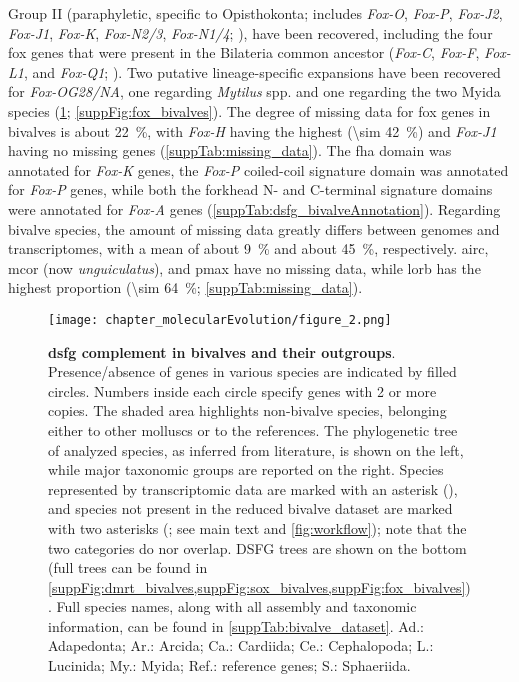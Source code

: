 Group II (paraphyletic, specific to Opisthokonta; includes \textit{Fox-O}, \textit{Fox-P}, \textit{Fox-J2}, \textit{Fox-J1}, \textit{Fox-K}, \textit{Fox-N2/3}, \textit{Fox-N1/4}; ), have been recovered, including the four \gls{fox} genes that were present in the Bilateria common ancestor (\textit{Fox-C}, \textit{Fox-F}, \textit{Fox-L1}, and \textit{Fox-Q1}; ). Two putative lineage-specific expansions have been recovered for \textit{Fox-OG28/NA}, one regarding \textit{Mytilus} spp. and one regarding the two Myida species (\cref{fig:DSFG_bivalveCompilation}; \cref{suppFig:fox_bivalves}). The degree of missing data for \gls{fox} genes in bivalves is about \qty{22}{\percent}, with \textit{Fox-H} having the highest (\qty{\sim 42}{\percent}) and \textit{Fox-J1} having no missing genes (\cref{suppTab:missing_data}). The \gls{fha} domain was annotated for \textit{Fox-K} genes, the \textit{Fox-P} coiled-coil signature domain was annotated for \textit{Fox-P} genes, while both the forkhead N- and C-terminal signature domains were annotated for \textit{Fox-A} genes (\cref{suppTab:dsfg_bivalveAnnotation}).
Regarding bivalve species, the amount of missing data greatly differs between genomes and transcriptomes, with a mean of about \qty{9}{\percent} and about \qty{45}{\percent}, respectively. \gls{airc}, \gls{mcor} (now \textit{unguiculatus}), and \gls{pmax} have no missing data, while \gls{lorb} has the highest proportion (\qty{\sim 64}{\percent}; \cref{suppTab:missing_data}).

\begin{figure}
	\centering
	\texttt{[image: chapter\_molecularEvolution/figure\_2.png]}
	
	\caption[\textbf{\gls{dsfg} complement in bivalves and their outgroups}]
	{
		\textbf{\gls{dsfg} complement in bivalves and their outgroups}. Presence/absence of genes in various species are indicated by filled circles. Numbers inside each circle specify genes with 2 or more copies. The shaded area highlights non-bivalve species, belonging either to other molluscs or to the references. The phylogenetic tree of analyzed species, as inferred from literature, is shown on the left, while major taxonomic groups are reported on the right. Species represented by transcriptomic data are marked with an asterisk (\singlecurlyquotes{*}), and species not present in the reduced bivalve dataset are marked with two asterisks (\singlecurlyquotes{**}; see main text and \cref{fig:workflow}); note that the two categories do nor overlap. DSFG trees are shown on the bottom (full trees can be found in \cref{suppFig:dmrt_bivalves,suppFig:sox_bivalves,suppFig:fox_bivalves}). Full species names, along with all assembly and taxonomic information, can be found in \cref{suppTab:bivalve_dataset}.  Ad.: Adapedonta; Ar.: Arcida; Ca.: Cardiida; Ce.: Cephalopoda; L.: Lucinida; My.: Myida; Ref.: reference genes; S.: Sphaeriida.
	}
	\label{fig:DSFG_bivalveCompilation}
\end{figure}

